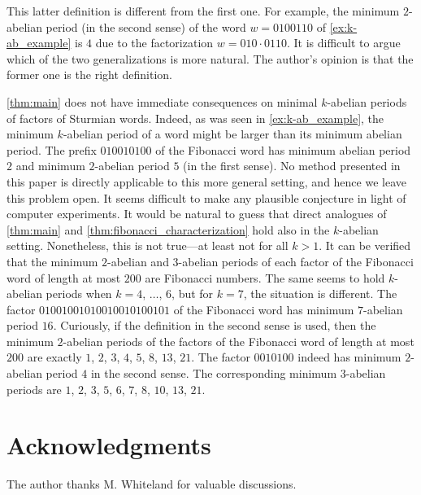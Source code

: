 \documentclass[a4paper,fleqn]{article}
\begin{document}
  This latter definition is different from the first one. For example, the minimum $2$-abelian period (in the second
  sense) of the word $w = 0100110$ of \autoref{ex:k-ab_example} is $4$ due to the factorization $w = 010 \cdot 0110$.
  It is difficult to argue which of the two generalizations is more natural. The author's opinion is that the former
  one is the right definition.

  \autoref{thm:main} does not have immediate consequences on minimal $k$-abelian periods of factors of Sturmian words.
  Indeed, as was seen in \autoref{ex:k-ab_example}, the minimum $k$-abelian period of a word might be larger than its
  minimum abelian period. The prefix $010010100$ of the Fibonacci word has minimum abelian period $2$ and minimum
  $2$-abelian period $5$ (in the first sense). No method presented in this paper is directly applicable to this more
  general setting, and hence we leave this problem open. It seems difficult to make any plausible conjecture in light
  of computer experiments. It would be natural to guess that direct analogues of \autoref{thm:main} and
  \autoref{thm:fibonacci_characterization} hold also in the $k$-abelian setting. Nonetheless, this is not true---at
  least not for all $k > 1$. It can be verified that the minimum $2$-abelian and $3$-abelian periods of each factor of
  the Fibonacci word of length at most $200$ are Fibonacci numbers. The same seems to hold $k$-abelian periods when
  $k = 4$, $\ldots$, $6$, but for $k = 7$, the situation is different. The factor $01001001010010010100101$ of the
  Fibonacci word has minimum $7$-abelian period $16$. Curiously, if the definition in the second sense is used, then
  the minimum $2$-abelian periods of the factors of the Fibonacci word of length at most $200$ are exactly $1$, $2$,
  $3$, $4$, $5$, $8$, $13$, $21$. The factor $0010100$ indeed has minimum $2$-abelian period $4$ in the second sense.
  The corresponding minimum $3$-abelian periods are $1$, $2$, $3$, $5$, $6$, $7$, $8$, $10$, $13$, $21$.

  \section*{Acknowledgments}
  The author thanks M. Whiteland for valuable discussions.

  \printbibliography
  
\end{document}
